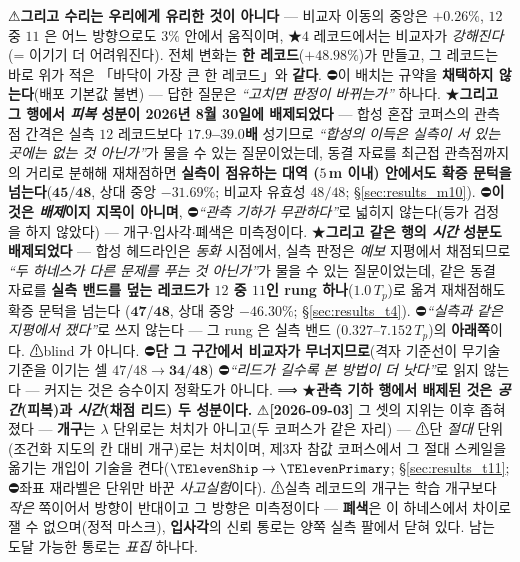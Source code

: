 \documentclass[11pt]{report}
\numberwithin{equation}{chapter}
\numberwithin{figure}{chapter}
\numberwithin{table}{chapter}
\begin{document}
⚠\textbf{그리고 수리는 우리에게 유리한 것이 아니다} --- 비교자 이동의 중앙은 $+0.26\%$,
$12$ 중 $11$ 은 어느 방향으로도 $3\%$ 안에서 움직이며, ★$4$ 레코드에서는 비교자가
\emph{강해진다}(= 이기기 더 어려워진다).
전체 변화는 \textbf{한 레코드}($+48.98\%$)가
만들고, 그 레코드는 바로 위가 적은 「바닥이 가장 큰 한 레코드」와 \textbf{같다}.
⛔이 배치는 규약을 \textbf{채택하지 않는다}(배포 기본값 불변) --- 답한 질문은
\emph{``고치면 판정이 바뀌는가''} 하나다.
★\textbf{그리고 그 행에서 \emph{피복} 성분이 2026년 8월 30일에 배제되었다} --- 합성
혼잡 코퍼스의 관측점 간격은 실측 $12$ 레코드보다 \textbf{$17.9$--$39.0$배} 성기므로
\emph{``합성의 이득은 실측이 서 있는 곳에는 없는 것 아닌가''}가 물을 수 있는 질문이었는데,
동결 자료를 최근접 관측점까지의 거리로 분해해 재채점하면 \textbf{실측이 점유하는 대역
($5$\,m 이내) 안에서도 확증 문턱을 넘는다}($\mathbf{45/48}$, 상대 중앙
$\mathbf{-31.69\%}$; 비교자 유효성 $48/48$; \S\ref{sec:results_m10}).
⛔\textbf{이것은 \emph{배제}이지 지목이 아니며}, ⛔\emph{``관측 기하가 무관하다''}로
넓히지 않는다(등가 검정을 하지 않았다) --- 개구$\cdot$입사각$\cdot$폐색은 미측정이다.
★\textbf{그리고 같은 행의 \emph{시간} 성분도 배제되었다} --- 합성 헤드라인은 \emph{동화}
시점에서, 실측 판정은 \emph{예보} 지평에서 채점되므로 \emph{``두 하네스가 다른 문제를
푸는 것 아닌가''}가 물을 수 있는 질문이었는데, 같은 동결 자료를 \textbf{실측 밴드를 덮는 레코드가
$12$ 중 $11$인 rung 하나}($1.0\,T_p$)로 옮겨 재채점해도 확증 문턱을 넘는다
($\mathbf{47/48}$, 상대 중앙 $\mathbf{-46.30\%}$; \S\ref{sec:results_t4}).
⛔\emph{``실측과 같은 지평에서 쟀다''}로 쓰지 않는다 --- 그 rung 은 실측 밴드
($0.327$--$7.152\,T_p$)의 \textbf{아래쪽}이다. ⚠blind 가 아니다. ⛔\textbf{단 그 구간에서 비교자가 무너지므로}(격자 기준선이
무기술 기준을 이기는 셀 $47/48 \to \mathbf{34/48}$) ⛔\emph{``리드가 길수록 본 방법이
더 낫다''}로 읽지 않는다 --- 커지는 것은 승수이지 정확도가 아니다.
⟹ ★\textbf{관측 기하 행에서 배제된 것은 \emph{공간}(피복)과 \emph{시간}(채점 리드)
두 성분이다.} ⚠\textbf{[2026-09-03]} 그 셋의 지위는 이후 좁혀졌다 --- \textbf{개구}는 $\lambda$ 단위로는 처치가 아니고(두 코퍼스가 같은 자리) --- ⚠단 \emph{절대} 단위(조건화 지도의 칸 대비 개구)로는 처치이며, 제3자 참값 코퍼스에서 그 절대 스케일을 옮기는 개입이 기술을 켠다($\TElevenShip \to \TElevenPrimary$; \S\ref{sec:results_t11}; ⛔좌표 재라벨은 단위만 바꾼 \emph{사고실험}이다). ⚠실측 레코드의 개구는 학습 개구보다 \emph{작은} 쪽이어서 방향이 반대이고 그 방향은 미측정이다 --- \textbf{폐색}은 이 하네스에서 차이로 잴 수 없으며(정적 마스크), \textbf{입사각}의 신뢰 통로는 양쪽 실측 팔에서 닫혀 있다. 남는 도달 가능한 통로는 \emph{표집} 하나다.
\end{document}
